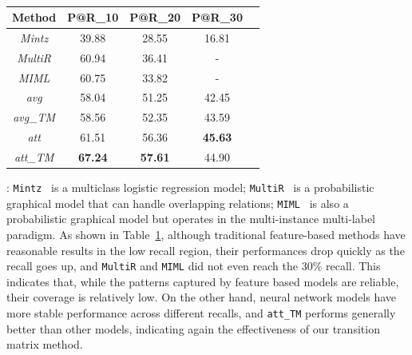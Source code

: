 \begin{table}
\centering
\small{
\begin{tabular}{|c|c|c|c|c|}
\hline
\textbf{Method}							& \textbf{P@R\_10} 		& \textbf{P@R\_20} 			& \textbf{P@R\_30} \\
\hline
\textit{Mintz} 							&39.88	&28.55	&16.81 	\\
\hline
\textit{MultiR} 						&60.94	&36.41	&- 	\\
\hline
\textit{MIML} 							&60.75	&33.82	&- 	\\
\hline
\textit{avg} 								&58.04	&51.25	&42.45 	\\
\hline
\textit{avg\_TM} 						&58.56	&52.35	&43.59 	\\
\hline
\textit{att} 								&61.51	&56.36	&\textbf{45.63} 	\\
\hline
\textit{att\_TM} 						&\textbf{67.24}	&\textbf{57.61}	&44.90 	\\
\hline
\end{tabular}
}
\caption{}
\label{feature-based}
\end{table}

: \texttt{Mintz}~\cite{mintz2009distant} is a multiclass logistic regression model; \texttt{MultiR}~\cite{hoffmann2011knowledge} is a probabilistic graphical model that can handle overlapping relations; \texttt{MIML}~\cite{surdeanu2012multi} is also a probabilistic graphical model but operates in the multi-instance multi-label paradigm. As shown in Table~\ref{feature-based}, although traditional feature-based methods have reasonable results in the low recall region, their performances drop quickly as the recall goes up, and \texttt{MultiR} and \texttt{MIML} did not even reach the 30\% recall. This indicates that, while the patterns captured by feature based models are reliable, their coverage is relatively low. On the other hand, neural network models have more stable performance across different recalls,
and \texttt{att\_TM} performs generally better than other models,
indicating again the effectiveness of our transition matrix method.







